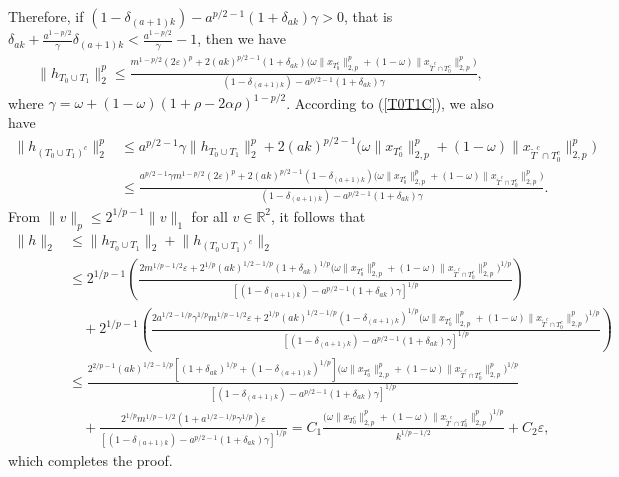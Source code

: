 \documentclass[11pt]{article}
\begin{document}
Therefore, if $(1-\delta_{(a+1)k})-a^{p/2-1}(1+\delta_{ak})\gamma>0$, that is $ \delta_{ak}+\frac{a^{1-p/2}}{\gamma}\delta_{(a+1)k}<\frac{a^{1-p/2}}{\gamma}-1$, then we have \begin{align}
\lVert h_{T_0\cup T_1}\rVert_2^p\leq \frac{m^{1-p/2}(2\varepsilon)^p+2(ak)^{p/2-1}(1+\delta_{ak})\Big(\omega\lVert x_{T_0^c}\rVert_{2,p}^p+(1-\omega)\lVert x_{\tilde{T}^c\cap T_0^c}\rVert_{2,p}^p\Big)}{(1-\delta_{(a+1)k})-a^{p/2-1}(1+\delta_{ak})\gamma},
\end{align}
where $\gamma=\omega+(1-\omega)(1+\rho-2\alpha\rho)^{1-p/2}$. According to (\ref{T0T1C}), we also have \begin{align*}
\lVert h_{(T_0\cup T_1)^c}\rVert_2^p&\leq a^{p/2-1}\gamma\lVert h_{T_0\cup T_1}\rVert_2^p+2(ak)^{p/2-1}\Big(\omega\lVert x_{T_0^c}\rVert_{2,p}^p+(1-\omega)\lVert x_{\tilde{T}^c\cap T_0^c}\rVert_{2,p}^p\Big)\\
&\leq \frac{a^{p/2-1}\gamma m^{1-p/2}(2\varepsilon)^p+2(ak)^{p/2-1}(1-\delta_{(a+1)k})\Big(\omega\lVert x_{T_0^c}\rVert_{2,p}^p+(1-\omega)\lVert x_{\tilde{T}^c\cap T_0^c}\rVert_{2,p}^p\Big)}{(1-\delta_{(a+1)k})-a^{p/2-1}(1+\delta_{ak})\gamma}.
\end{align*}
From $\lVert v\rVert_p\leq 2^{1/p-1}\lVert v\rVert_1$ for all $v\in \mathbb{R}^2$, it follows that  \begin{align*}
\lVert h\rVert_2&\leq \lVert h_{T_0\cup T_1}\rVert_2+ \lVert h_{(T_0\cup T_1)^c}\rVert_2 \\
&\leq 2^{1/p-1}\left(\frac{2m^{1/p-1/2}\varepsilon+2^{1/p}(ak)^{1/2-1/p}(1+\delta_{ak})^{1/p}\Big(\omega\lVert x_{T_0^c}\rVert_{2,p}^p+(1-\omega)\lVert x_{\tilde{T}^c\cap T_0^c}\rVert_{2,p}^p\Big)^{1/p}}{[(1-\delta_{(a+1)k})-a^{p/2-1}(1+\delta_{ak})\gamma]^{1/p}}\right)\\
&\quad+2^{1/p-1}\left(\frac{2a^{1/2-1/p}\gamma^{1/p}m^{1/p-1/2}\varepsilon+2^{1/p}(ak)^{1/2-1/p}(1-\delta_{(a+1)k})^{1/p}\Big(\omega\lVert x_{T_0^c}\rVert_{2,p}^p+(1-\omega)\lVert x_{\tilde{T}^c\cap T_0^c}\rVert_{2,p}^p\Big)^{1/p}}{[(1-\delta_{(a+1)k})-a^{p/2-1}(1+\delta_{ak})\gamma]^{1/p}}\right)\\
&\leq \frac{2^{2/p-1}(ak)^{1/2-1/p}\left[(1+\delta_{ak})^{1/p}+(1-\delta_{(a+1)k})^{1/p}\right]\Big(\omega\lVert x_{T_0^c}\rVert_{2,p}^p+(1-\omega)\lVert x_{\tilde{T}^c\cap T_0^c}\rVert_{2,p}^p\Big)^{1/p}}{[(1-\delta_{(a+1)k})-a^{p/2-1}(1+\delta_{ak})\gamma]^{1/p}} \\
&\quad+\frac{2^{1/p}m^{1/p-1/2}(1+a^{1/2-1/p}\gamma^{1/p})\varepsilon}{[(1-\delta_{(a+1)k})-a^{p/2-1}(1+\delta_{ak})\gamma]^{1/p}}=C_1\frac{\Big(\omega\lVert x_{T_0^c}\rVert_{2,p}^p+(1-\omega)\lVert x_{\tilde{T}^c\cap T_0^c}\rVert_{2,p}^p\Big)^{1/p}}{k^{1/p-1/2}}+C_2\varepsilon,
\end{align*}
which completes the proof.\\
\end{document}
